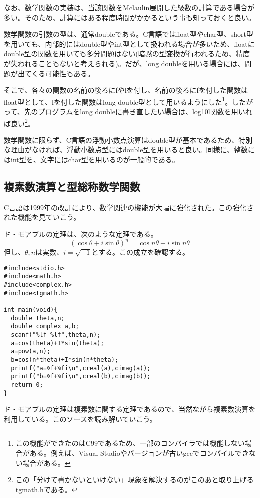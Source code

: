 なお、数学関数の実装は、当該関数をMclaulin展開した級数の計算である場合が多い。そのため、計算にはある程度時間がかかるという事も知っておくと良い。

数学関数の引数の型は、通常doubleである。C言語ではfloat型やchar型、short型を用いても、内部的にはdouble型やint型として扱われる場合が多いため、floatにdouble型の関数を用いても多分問題はない(暗黙の型変換が行われるため、精度が失われることもないと考えられる)。だが、long doubleを用いる場合には、問題が出てくる可能性もある。

そこで、各々の関数の名前の後ろにfやlを付し、名前の後ろにfを付した関数はfloat型として、lを付した関数はlong double型として用いるようにした\footnote{この機能ができたのはC99であるため、一部のコンパイラでは機能しない場合がある。例えば、Visual Studioやバージョンが古いgccでコンパイルできない場合がある。}。したがって、先のプログラムをlong doubleに書き直したい場合は、log10l関数を用いれば良い\footnote{この「分けて書かないといけない」現象を解決するのがこのあと取り上げるtgmath.hである。}。

数学関数に限らず、C言語の浮動小数点演算はdouble型が基本であるため、特別な理由がなければ、浮動小数点型にはdouble型を用いると良い。同様に、整数にはint型を、文字にはchar型を用いるのが一般的である。

\subsection{複素数演算と型総称数学関数}
C言語は1999年の改訂により、数学関連の機能が大幅に強化された。この強化された機能を見ていこう。
\begin{boxnote}
ド・モアブルの定理は、次のような定理である。
\[(\cos\theta+i\sin\theta)^n=\cos n\theta+i\sin n\theta\]
但し、$\theta,n$は実数、$i=\sqrt{-1}$とする。この成立を確認する。
\begin{lstlisting}[caption=ド・モアブルの定理,label=program3_4]
#include<stdio.h>
#include<math.h>
#include<complex.h>
#include<tgmath.h>

int main(void){
  double theta,n;
  double complex a,b;
  scanf("%lf %lf",theta,n);
  a=cos(theta)+I*sin(theta);
  a=pow(a,n);
  b=cos(n*theta)+I*sin(n*theta);
  printf("a=%f+%fi\n",creal(a),cimag(a));
  printf("b=%f+%fi\n",creal(b),cimag(b));
  return 0;
}
\end{lstlisting}
\end{boxnote}

ド・モアブルの定理は複素数に関する定理であるので、当然ながら複素数演算を利用している。このソースを読み解いていこう。

